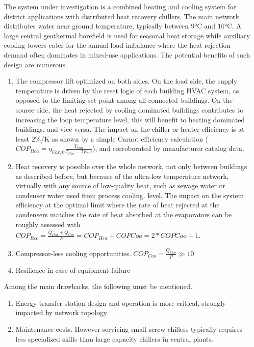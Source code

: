 The system under investigation is a combined heating and cooling system for district applications with distributed heat recovery chillers. The main network distributes water near ground temperature, typically between $9$°C and $16$°C. A large central geothermal borefield is used for seasonal heat storage while auxiliary cooling towers cater for the annual load imbalance where the heat rejection demand often dominates in mixed-use applications.
The potential benefits of such design are numerous.
\begin{enumerate}
    \item The compressor lift optimized on both sides. On the load side, the supply temperature is driven by the reset logic of each building HVAC system, as opposed to the limiting set point among all connected buildings. On the source side, the heat rejected by cooling dominated buildings contributes to increasing the loop temperature level, this will benefit to heating dominated buildings, and vice versa. The impact on the chiller or heater efficiency is at least $2$\%/K as shown by a simple Carnot efficiency calculation ($COP_{Hea} = \eta_{Car, 0} \frac{T_{Con}}{T_{Con}-T{Eva}}$), and corroborated by manufacturer catalog data.
    \item Heat recovery is possible over the whole network, not only between buildings as described before, but because of the ultra-low temperature network, virtually with any source of low-quality heat, such as sewage water or condenser water used from process cooling. level. The impact on the system efficiency at the optimal limit where the rate of heat rejected at the condensers matches the rate of heat absorbed at the evaporators can be roughly assessed with $ COP_{Rec} = \frac{\dot Q_{Hea} + \dot Q_{Coo}}{P} = COP_{Hea} + COP{Coo} = 2 * COP{Coo} + 1 $.
    \item Compressor-less cooling opportunities.  $ COP_{Coo} = \frac{\dot Q_{Coo}}{P} \gg 10 $
    \item Resilience in case of equipment failure
\end{enumerate}
Among the main drawbacks, the following must be mentioned.
\begin{enumerate}
    \item Energy transfer station design and operation is more critical, strongly impacted by network topology
    \item Maintenance costs. However servicing small screw chillers typically requires less specialized skills than large capacity chillers in central plants.
\end{enumerate}

